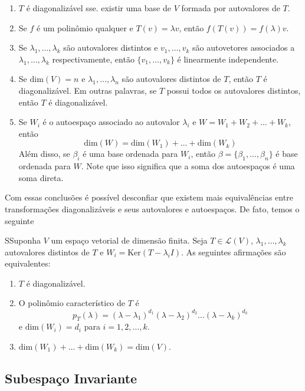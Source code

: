 \documentclass[12pt,a4paper]{article}
\begin{document}
\begin{enumerate}
\item $T$ é diagonalizável sse. existir uma base de $V$ formada por autovalores de $T$.
\item Se $f$ é um polinômio qualquer e $T(v)=\lambda v$, então $f(T(v)) = f(\lambda)v$.
\item Se $\lambda_1, \ldots, \lambda_k$ são autovalores distintos e $v_1, \ldots, v_k$ são autovetores associados a $\lambda_1, \ldots, \lambda_k$ respectivamente, então $\{ v_1, \ldots, v_k \}$ é linearmente independente.
\item Se $\text{dim}(V)=n$ e $\lambda_1, \ldots, \lambda_n$ são autovalores distintos de $T$, então $T$ é diagonalizável. Em outras palavras, se $T$ possui todos os autovalores distintos, então $T$ é diagonalizável.
\item Se $W_i$ é o autoespaço associado ao autovalor $\lambda_i$ e $W = W_1 + W_2 + \ldots + W_k$, então \[ \text{dim} (W) = \text{dim} (W_1) + \ldots + \text{dim} (W_k) \] Além disso, se $\beta_i$ é uma base ordenada para $W_i$, então $\beta = \{ \beta_1, \ldots, \beta_n \}$ é base ordenada para $W$. Note que isso significa que a soma dos autoespaços é uma soma direta.
\end{enumerate}

Com essas conclusões é possível desconfiar que existem mais equivalências entre transformações diagonalizáveis e seus autovalores e autoespaços. De fato, temos o seguinte

\begin{teorema}{}
  SSuponha $V$ um espaço vetorial de dimensão finita. Seja $T \in \mathcal{L}(V)$, $\lambda_1, \ldots, \lambda_k$ autovalores distintos de $T$ e $W_i = \text{Ker}(T - \lambda_i I)$. As seguintes afirmações são equivalentes:
\begin{enumerate}
\item $T$ é diagonalizável.
\item O polinômio característico de $T$ é \[ p_T(\lambda) = (\lambda - \lambda_1)^{d_1} (\lambda - \lambda_2)^{d_2} \ldots (\lambda - \lambda_k)^{d_k} \] e $\text{dim}(W_i) = d_i$ para $i = 1, 2, \ldots, k$.
\item $\text{dim}(W_1) + \ldots + \text{dim}(W_k) = \text{dim}(V)$.
\end{enumerate}
\end{teorema}

\subsection{Subespaço Invariante}
\end{document}
